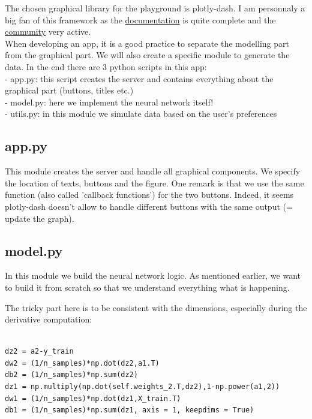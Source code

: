The chosen graphical library for the playground is plotly-dash. I am personnaly a big fan of this framework as the \href{https://dash.plotly.com/}{documentation} is quite complete and the \href{https://community.plotly.com/c/dash/16}{community} very active. \\

When developing an app, it is a good practice to separate the modelling part from the graphical part. We will also create a specific module to generate the data. In the end there are 3 python scripts in this app: \\

- app.py: this script creates the server and contains everything about the graphical part (buttons, titles etc.) \\

- model.py: here we implement the neural network itself! \\

- utils.py: in this module we simulate data based on the user's preferences \\

\subsection{app.py}

This module creates the server and handle all graphical components. We specify the location of texts, buttons and the figure. One remark is that we use the same function (also called 'callback functions') for the two buttons. Indeed, it seems plotly-dash doesn't allow to handle different buttons with the same output (= update the graph).

\subsection{model.py}

In this module we build the neural network logic. As mentioned earlier, we want to build it from scratch so that we understand everything what is happening. 

The tricky part here is to be consistent with the dimensions, especially during the derivative computation:

\lstset{language=Python}
\lstset{frame=lines}
\lstset{basicstyle=\footnotesize}
\begin{lstlisting}

dz2 = a2-y_train
dw2 = (1/n_samples)*np.dot(dz2,a1.T)
db2 = (1/n_samples)*np.sum(dz2)
dz1 = np.multiply(np.dot(self.weights_2.T,dz2),1-np.power(a1,2))
dw1 = (1/n_samples)*np.dot(dz1,X_train.T)
db1 = (1/n_samples)*np.sum(dz1, axis = 1, keepdims = True)

\end{lstlisting}


